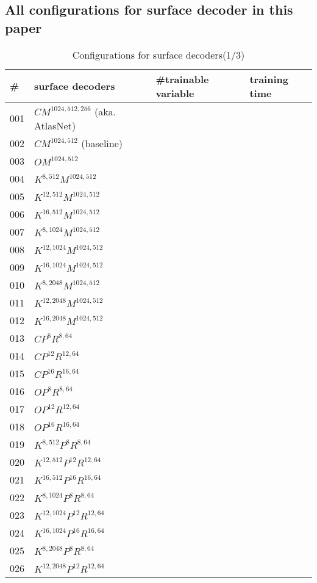 \begin{appendices}
\section{All configurations for surface decoder in this paper}
\begin{table*}
	\caption{Configurations for surface decoders(1/3)}
	\label{tab:surf_dec1}
	\centering
	\begin{tabular}{| l | l | l | l }
		\hline
		\hline
		\#&surface decoders & \#trainable variable & training time \\
		\hline
		001&$CM^{1024,512,256}$ (aka. AtlasNet\cite{atlasnet})&~&~\\
		002&$CM^{1024,512}$ (baseline)&~&~\\
		003&$OM^{1024,512}$ &~&~\\
		004&$K^{8,512}M^{1024,512}$ &~&~\\
		005&$K^{12,512}M^{1024,512}$ &~&~\\
		006&$K^{16,512}M^{1024,512}$ &~&~\\
		007&$K^{8,1024}M^{1024,512}$ &~&~\\
		008&$K^{12,1024}M^{1024,512}$ &~&~\\
		009&$K^{16,1024}M^{1024,512}$ &~&~\\
		010&$K^{8,2048}M^{1024,512}$ &~&~\\
		011&$K^{12,2048}M^{1024,512}$ &~&~\\
		012&$K^{16,2048}M^{1024,512}$ &~&~\\
		013&$CP^8R^{8,64}$ &~&~\\
		014&$CP^{12}R^{12,64}$ &~&~\\
		015&$CP^{16}R^{16,64}$ &~&~\\
		016&$OP^8R^{8,64}$ &~&~\\
		017&$OP^{12}R^{12,64}$ &~&~\\
		018&$OP^{16}R^{16,64}$ &~&~\\
		019&$K^{8,512}P^{8}R^{8,64}$ &~&~\\
		020&$K^{12,512}P^{12}R^{12,64}$ &~&~\\
		021&$K^{16,512}P^{16}R^{16,64}$ &~&~\\
		022&$K^{8,1024}P^{8}R^{8,64}$ &~&~\\
		023&$K^{12,1024}P^{12}R^{12,64}$ &~&~\\
		024&$K^{16,1024}P^{16}R^{16,64}$ &~&~\\
		025&$K^{8,2048}P^{8}R^{8,64}$ &~&~\\
		026&$K^{12,2048}P^{12}R^{12,64}$ &~&~\\

\end{tabular}
\end{table*}
\end{appendices}
